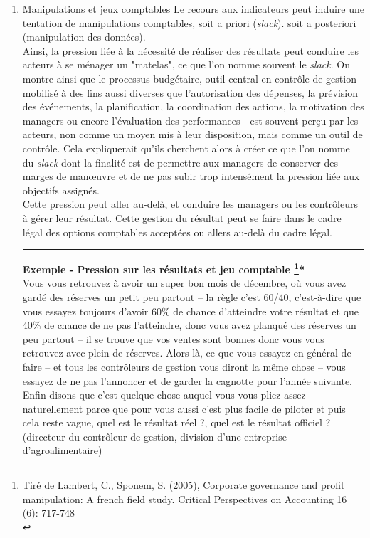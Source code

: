 \documentclass{tufte-handout}
\begin{document}
\begin{enumerate}
\item Manipulations et jeux comptables
\label{sec:orgff5881d}
Le recours aux indicateurs peut induire une tentation de manipulations comptables, soit a priori (\emph{slack}). soit a posteriori (manipulation des données).\\

Ainsi, la pression liée à la nécessité de réaliser des résultats peut conduire les acteurs à se ménager un "matelas", ce que l’on nomme souvent le \emph{slack}. On montre ainsi que le processus budgétaire, outil central en contrôle de gestion - mobilisé à des fins aussi diverses que l’autorisation des dépenses, la prévision des événements, la planification, la coordination des actions, la motivation des managers ou encore l’évaluation des performances - est souvent perçu par les acteurs, non comme un moyen mis à leur disposition, mais comme un outil de contrôle. Cela expliquerait qu’ils cherchent alors à créer ce que l’on nomme du \emph{slack} dont la finalité est de permettre aux managers de conserver des marges de manœuvre et de ne pas subir trop intensément la pression liée aux objectifs assignés.\\

Cette pression peut aller au-delà, et conduire les managers ou les contrôleurs à gérer leur résultat. Cette gestion du résultat peut se faire dans le cadre légal des options comptables acceptées ou allers au-delà du cadre légal.\\

\noindent\rule{\textwidth}{0.5pt}
\textbf{Exemple - Pression sur les résultats et jeu comptable \footnote{Tiré de Lambert, C., Sponem, S. (2005), Corporate governance and profit manipulation: A french field study. Critical Perspectives on Accounting 16 (6): 717-748\\}*}\\
Vous vous retrouvez à avoir un super bon mois de décembre, où vous  avez gardé des réserves un petit peu partout – la règle c’est 60/40, c’est-à-dire que vous essayez toujours d’avoir 60\% de chance d’atteindre votre résultat et que 40\% de chance de ne pas l’atteindre, donc vous avez planqué des réserves un peu partout – il se trouve que vos ventes sont bonnes donc vous vous retrouvez avec plein de réserves. Alors là, ce que vous essayez en général de faire – et tous les contrôleurs de gestion vous diront la même chose – vous essayez de ne pas l’annoncer et de garder la cagnotte pour l’année suivante. Enfin disons que c’est quelque chose auquel vous vous pliez assez naturellement parce que pour vous aussi c’est plus facile de piloter et puis cela reste vague, quel est le résultat réel ?, quel est le résultat officiel ? (directeur du contrôleur de gestion, division d’une entreprise d’agroalimentaire)\\


\end{enumerate}
\end{document}
